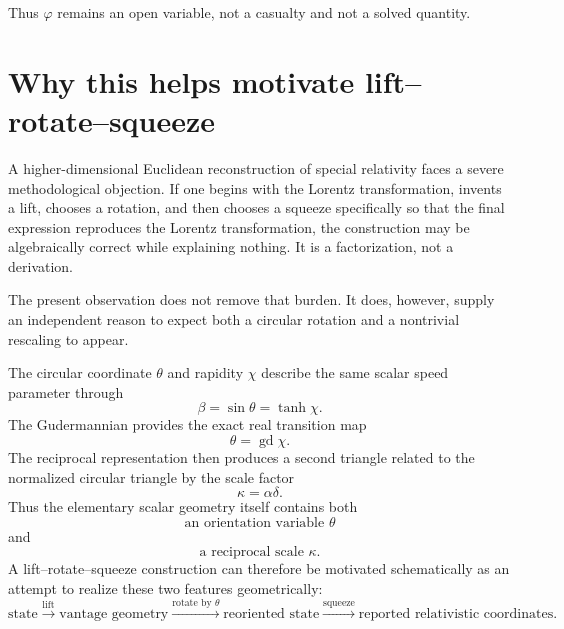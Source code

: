 \documentclass[11pt]{article}
\DeclareMathOperator{\gd}{gd}
\begin{document}
Thus $\varphi$ remains an open variable, not a casualty and not a solved
quantity.

\section{Why this helps motivate lift--rotate--squeeze}

A higher-dimensional Euclidean reconstruction of special relativity faces a
severe methodological objection. If one begins with the Lorentz
transformation, invents a lift, chooses a rotation, and then chooses a squeeze
specifically so that the final expression reproduces the Lorentz
transformation, the construction may be algebraically correct while
explaining nothing. It is a factorization, not a derivation.

The present observation does not remove that burden. It does, however,
supply an independent reason to expect both a circular rotation and a
nontrivial rescaling to appear.

The circular coordinate $\theta$ and rapidity $\chi$ describe the same
scalar speed parameter through
\begin{equation}
\beta=\sin\theta=\tanh\chi.
\label{eq:twoparameterizations}
\end{equation}
The Gudermannian provides the exact real transition map
\begin{equation}
\theta=\gd\chi.
\label{eq:gdtransition}
\end{equation}
The reciprocal representation then produces a second triangle related to the
normalized circular triangle by the scale factor
\begin{equation}
\kappa=\alpha\delta.
\label{eq:kappaagain}
\end{equation}
Thus the elementary scalar geometry itself contains both
\begin{equation}
\text{an orientation variable }\theta
\end{equation}
and
\begin{equation}
\text{a reciprocal scale }\kappa.
\end{equation}
A lift--rotate--squeeze construction can therefore be motivated schematically
as an attempt to realize these two features geometrically:
\begin{equation}
\text{state}
\xrightarrow{\text{lift}}
\text{vantage geometry}
\xrightarrow{\text{rotate by }\theta}
\text{reoriented state}
\xrightarrow{\text{squeeze}}
\text{reported relativistic coordinates}.
\label{eq:lrs}
\end{equation}
\end{document}
